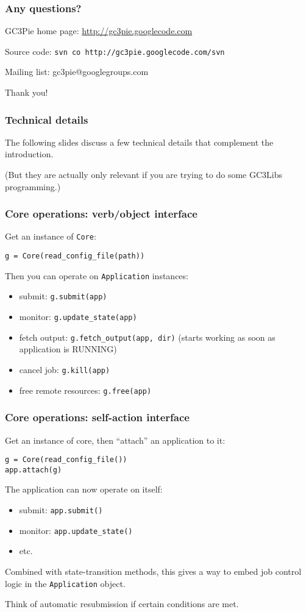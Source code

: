 \documentclass[presentation]{beamer}
\begin{document}
\begin{frame}
\frametitle{Any questions?}
\label{sec-30}

\begin{center}
GC3Pie home page: \href{http://gc3pie.googlecode.com}{http://gc3pie.googlecode.com}

Source code: \texttt{svn co http://gc3pie.googlecode.com/svn}

Mailing list: gc3pie@googlegroups.com

Thank you!
\end{center}
\end{frame}
\begin{frame}
\frametitle{Technical details}
\label{sec-31}

  The following slides discuss a few technical details that complement
  the introduction.

  (But they are actually only relevant if you are trying to do some
  GC3Libs programming.)
\end{frame}
\begin{frame}[fragile]
\frametitle{Core operations: verb/object interface}
\label{sec-32}

  Get an instance of \texttt{Core}:
\begin{verbatim}
g = Core(read_config_file(path))
\end{verbatim}

  Then you can operate on \texttt{Application} instances:
\begin{itemize}
\item submit: \texttt{g.submit(app)}
\item monitor: \texttt{g.update\_state(app)}
\item fetch output: \texttt{g.fetch\_output(app, dir)} (starts working as soon as
    application is RUNNING)
\item cancel job: \texttt{g.kill(app)}
\item free remote resources: \texttt{g.free(app)}
\end{itemize}
\end{frame}
\begin{frame}[fragile]
\frametitle{Core operations: self-action interface}
\label{sec-33}

  Get an instance of core, then ``attach'' an application to it:
\begin{verbatim}
g = Core(read_config_file())
app.attach(g)
\end{verbatim}

  The application can now operate on itself:
\begin{itemize}
\item submit: \texttt{app.submit()}
\item monitor: \texttt{app.update\_state()}
\item etc.
\end{itemize}

  Combined with state-transition methods, this gives a way to embed
  job control logic in the \texttt{Application} object.

  Think of automatic resubmission if certain conditions are met.
\end{frame}
\end{document}
